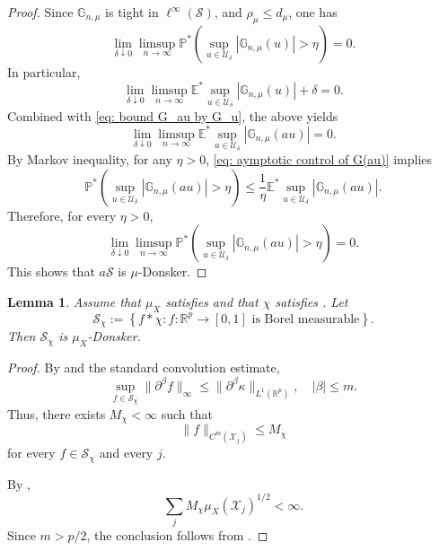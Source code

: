 \documentclass{amsart}
\theoremstyle{plain}
\numberwithin{equation}{section}\newtheorem{theorem}{Theorem}[section]
\newtheorem{lemma}[theorem]{Lemma}
\theoremstyle{remark}
\begin{document}
\begin{proof}
Since $\mathbb{G}_{n,\mu}$ is tight in $\ell^\infty(\mathcal{S})$, and $\rho_\mu\leq d_\mu$, one has 
\[
    \lim_{\delta\downarrow 0}
    \limsup_{n\to\infty} \mathbb{P}^*\left(\sup_{u\in\mathcal U_\delta}
\left| \mathbb{G}_{n,\mu}(u) \right|>\eta\right)=0.
\]
In particular,
\[
    \lim_{\delta\downarrow 0}
    \limsup_{n\to\infty} \mathbb{E}^* \sup_{u\in\mathcal U_\delta}
\left| \mathbb{G}_{n,\mu}(u) \right| + \delta = 0.
\]
Combined with \eqref{eq: bound G_au by G_u}, the above yields
\begin{equation}\label{eq: aymptotic control of G(au)}
    \lim_{\delta\downarrow 0}
    \limsup_{n\to\infty} \mathbb{E}^* \sup_{u\in\mathcal U_\delta}
\left| \mathbb{G}_{n,\mu}(au) \right| = 0.
\end{equation}
By Markov inequality, for any $\eta > 0$, \eqref{eq: aymptotic control of G(au)} implies
\[
    \mathbb{P}^*\left(\sup_{u\in\mathcal U_\delta}
\left|
    \mathbb{G}_{n,\mu}(au) \right|>\eta\right) \leq \frac{1}{\eta} \mathbb{E}^* \sup_{u\in\mathcal U_\delta}
\left| \mathbb{G}_{n,\mu}(au) \right|.
\]
Therefore, for every $\eta>0$,
\[
\lim_{\delta\downarrow 0}
    \limsup_{n\to\infty} \mathbb{P}^*\left(\sup_{u\in\mathcal U_\delta}
\left|
    \mathbb{G}_{n,\mu}(au) \right|>\eta\right)=0.
\]
This shows that $a \mathcal{S}$ is $\mu$-Donsker.
\end{proof}





\begin{lemma}\label{lem: convolution makes donsker}
Assume that $\mu_X$ satisfies
and that $\chi$ satisfies
. Let
\[
    \mathcal S_\chi
    :=
    \left\{
        f*\chi :
        f:\mathbb R^p\to[0,1]
        \text{ is Borel measurable}
    \right\}.
\]
Then $\mathcal S_\chi$ is $\mu_X$-Donsker.
\end{lemma}

\begin{proof}
By  and the standard convolution estimate,
\[
    \sup_{f\in\mathcal S_\chi}
    \|\partial^\beta f\|_\infty
    \leq
    \|\partial^\beta\kappa\|_{L^1(\mathbb R^p)},
    \quad |\beta|\leq m.
\]
Thus, there exists
$M_\chi<\infty$ such that
\[
    \|f\|_{C^m(\mathcal X_j)}\leq M_\chi
\]
for every $f\in\mathcal S_\chi$ and every $j$.

By ,
\[
    \sum_j M_\chi\mu_X(\mathcal X_j)^{1/2}<\infty.
\]
Since $m>p/2$, the conclusion follows from
\cite[Example~2.10.28]{MR4628026}.
\end{proof}
\end{document}
